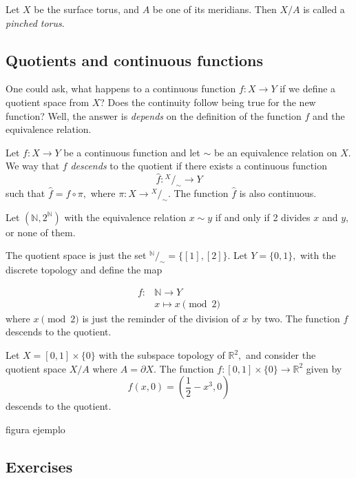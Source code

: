 \documentclass[
	fontsize=10pt, %
	twoside=false, %
	secnumdepth=1, %
]{kaobook}
\begin{document}
\begin{example}
Let $X$ be the surface torus, and $A$ be one of its meridians. Then $X/A$ is called a \emph{pinched torus}.
\end{example}


\subsection{Quotients and continuous functions}

One could ask, what happens to a continuous function $f: X\to Y$ if we define a quotient space from $X$? Does the continuity follow being true for the new function? Well, the answer is \textit{depends} on the definition of the function $f$ and the equivalence relation.

\begin{definition}
Let $f: X\to Y$ be a continuous function and let $\sim$ be an equivalence relation on $X.$ We way that $f$ \emph{descends} to the quotient if there exists a continuous function $$\hat{f}:{}^X/_\sim \to Y$$ such that $\hat{f}=f\circ \pi,$ where $\pi: X\to {}^X/_\sim.$ The function $\hat{f}$ is also continuous.
\end{definition} 


\begin{example}
Let $(\mathbb{N},2^{\mathbb{N}})$ with the equivalence relation $x\sim y$ if and only if 2 divides $x$ and $y,$ or none of them.

The quotient space is just the set ${}^{\mathbb{N}}/_\sim=\{[1],[2]\}.$ Let $Y=\{0,1\},$ with the discrete topology and define the map

\begin{eqnarray*}
f: & \mathbb{N} \to Y \\
& x\mapsto x\pmod 2
\end{eqnarray*} where $x\pmod 2$ is just the reminder of the division of $x$ by two. The function $f$ descends to the quotient.
\end{example}

\begin{example}
Let $X=[0,1]\times\{0\}$ with the subspace topology of $\mathbb{R}^2,$ and consider the quotient space $X/A$ where $A=\partial X.$ The function $f:[0,1]\times\{0\} \to \mathbb{R}^2$ given by $$f(x,0)=\left(\frac{1}{2}-x^3,0\right)$$ descends to the quotient. 

figura ejemplo 
\end{example}

\subsection{Exercises}
\end{document}
